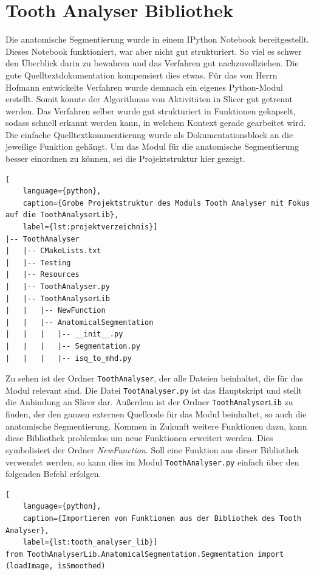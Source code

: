 \section{Tooth Analyser Bibliothek}
Die anatomische Segmentierung wurde in einem IPython Notebook bereitgestellt.
Dieses Notebook funktioniert, war aber nicht gut strukturiert. So viel es schwer
den Überblick darin zu bewahren und das Verfahren gut nachzuvollziehen. Die gute
Quelltextdokumentation kompensiert dies etwas. Für das von Herrn Hofmann
entwickelte Verfahren wurde demnach ein eigenes Python-Modul erstellt. Somit konnte
der Algorithmus von Aktivitäten in Slicer gut getrennt werden. Das Verfahren
selber wurde gut strukturiert in Funktionen gekapselt, sodass schnell erkannt werden
kann, in welchem Kontext gerade gearbeitet wird. Die einfache Quelltextkommentierung
wurde als Dokumentationsblock an die jeweilige Funktion gehängt. Um das Modul
für die anatomische Segmentierung besser einordnen zu können, sei die Projektstruktur
hier gezeigt.

\begin{lstlisting}[
    language={python},
    caption={Grobe Projektstruktur des Moduls Tooth Analyser mit Fokus auf die ToothAnalyserLib},
    label={lst:projektverzeichnis}]
|-- ToothAnalyser
|   |-- CMakeLists.txt
|   |-- Testing
|   |-- Resources
|   |-- ToothAnalyser.py
|   |-- ToothAnalyserLib
|   |   |-- NewFunction
|   |   |-- AnatomicalSegmentation
|   |   |   |-- __init__.py
|   |   |   |-- Segmentation.py
|   |   |   |-- isq_to_mhd.py
\end{lstlisting}

Zu sehen ist der Ordner \texttt{ToothAnalyser}, der alle Dateien beinhaltet, die
für das Modul relevant sind. Die Datei \texttt{TootAnalyser.py} ist das Hauptskript
und stellt die Anbindung an Slicer dar. Außerdem ist der Ordner \texttt{ToothAnalyserLib}
zu finden, der den ganzen externen Quellcode für das Modul beinhaltet, so auch die
anatomische Segmentierung. Kommen in Zukunft weitere Funktionen dazu, kann diese
Bibliothek problemlos um neue Funktionen erweitert werden. Dies symbolisiert der
Ordner \textsl{NewFunction}. Soll eine Funktion aus dieser Bibliothek verwendet
werden, so kann dies im Modul \texttt{ToothAnalyser.py} einfach über den
folgenden Befehl erfolgen.

\begin{lstlisting}[
    language={python},
    caption={Importieren von Funktionen aus der Bibliothek des Tooth Analyser},
    label={lst:tooth_analyser_lib}]
from ToothAnalyserLib.AnatomicalSegmentation.Segmentation import (loadImage, isSmoothed)
\end{lstlisting}

